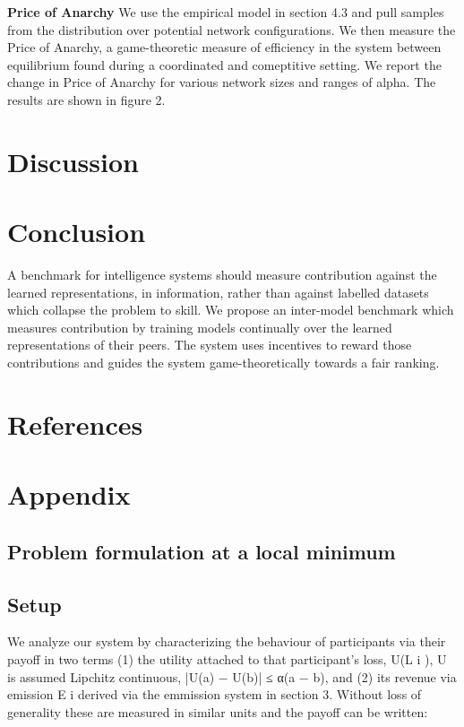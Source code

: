 \documentclass{article}
\begin{document}
\textbf{Price of Anarchy} We use the empirical model in section 4.3 and pull samples from the distribution over potential network configurations. We then measure the Price of Anarchy, a game-theoretic measure of efficiency in the system between equilibrium found during a coordinated and comeptitive setting. We report the change in Price of Anarchy for various network sizes and ranges of alpha. The results are shown in figure 2.
\smallskip


\section{Discussion}


\section{Conclusion}

A benchmark for intelligence systems should measure contribution against the learned representations, in information, rather than against labelled datasets which collapse the problem to skill. We propose an inter-model benchmark which measures contribution by training models continually over the learned representations of their peers. The system uses incentives to reward those contributions and guides the system game-theoretically towards a fair ranking. 



\section{References}




\section{Appendix}

\subsection{Problem formulation at a local minimum}

\subsection{Setup}

We analyze our system by characterizing the behaviour of participants via their payoﬀ in two terms (1) the utility attached to that participant’s loss, U(L i ), U is assumed Lipchitz continuous, |U(a) − U(b)| ≤ α(a − b), and (2) its revenue via emission E i derived via the emmission system in section 3. Without loss of generality these are measured in similar units and the payoﬀ can be written:
\end{document}

